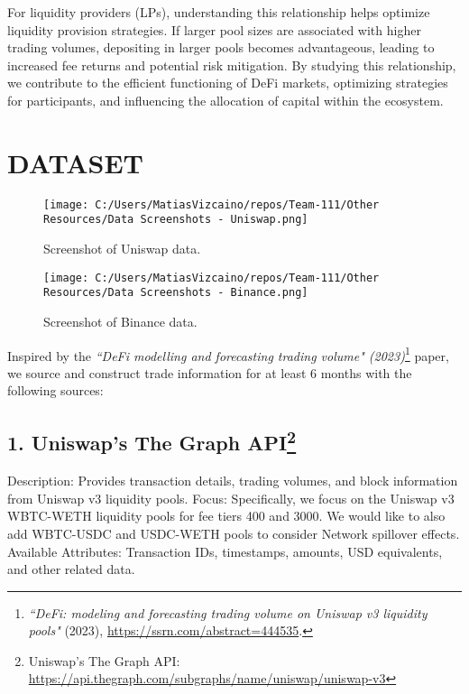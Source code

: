 \documentclass{article}
\begin{document}
{For liquidity providers (LPs), understanding this relationship helps optimize liquidity provision strategies. If larger pool sizes are associated with higher trading volumes, depositing in larger pools becomes advantageous, leading to increased fee returns and potential risk mitigation. By studying this relationship, we contribute to the efficient functioning of DeFi markets, optimizing strategies for participants, and influencing the allocation of capital within the ecosystem.

\newpage
\section*{DATASET}

\begin{wrapfigure}[8]{r}{0.2\textwidth}
\vspace{-40pt} %
\centering
\texttt{[image: C:/Users/MatiasVizcaino/repos/Team-111/Other Resources/Data Screenshots - Uniswap.png]}
\caption{Screenshot of Uniswap data.}
\label{fig:uniswap-screenshot}
\vspace{3pt} %
\texttt{[image: C:/Users/MatiasVizcaino/repos/Team-111/Other Resources/Data Screenshots - Binance.png]}
\caption{Screenshot of Binance data.}
\label{fig:binance-screenshot}
\end{wrapfigure}

Inspired by the \textit{“DeFi modelling and forecasting trading volume" (2023)}\footnote{\textit{“DeFi: modeling and forecasting trading volume on Uniswap v3 liquidity pools"} (2023), \url{https://ssrn.com/abstract=444535}.} paper, we source and construct trade information for at least 6 months with the following sources:


\subsection*{1. Uniswap's The Graph API\footnote{Uniswap's The Graph API: \url{https://api.thegraph.com/subgraphs/name/uniswap/uniswap-v3}}}
\begin{minipage}[t]{0.78\textwidth}
Description: Provides transaction details, trading volumes, and block information from Uniswap v3 liquidity pools.
Focus: Specifically, we focus on the Uniswap v3 WBTC-WETH liquidity pools for fee tiers 400 and 3000. We would like to also add WBTC-USDC and USDC-WETH pools to consider Network spillover effects.
Available Attributes: Transaction IDs, timestamps, amounts, USD equivalents, and other related data.
\end{minipage}

}
\end{document}
